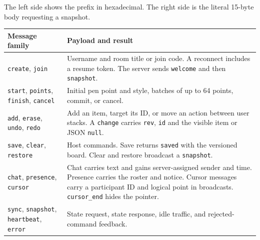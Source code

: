 \documentclass[11pt,a4paper]{article}
\newcommand{\code}[1]{\texttt{#1}}
\newcommand{\command}[1]{\par\smallskip{\small\ttfamily #1}\par\smallskip}
\begin{document}
\command{00 00 00 0F\quad\{"type":"sync"\}}
The left side shows the prefix in hexadecimal. The right side is the literal 15-byte body requesting a snapshot.

\begin{center}
\label{fig:sequence}
\end{center}

\small
\begin{tabularx}{\linewidth}{@{}P{36mm}Y@{}}
\toprule
\textbf{Message family} & \textbf{Payload and result}\\
\midrule
\code{create}, \code{join} & Username and room title or join code. A reconnect includes a resume token. The server sends \code{welcome} and then \code{snapshot}.\\
\code{start}, \code{points}, \code{finish}, \code{cancel} & Initial pen point and style, batches of up to 64 points, commit, or cancel.\\
\code{add}, \code{erase}, \code{undo}, \code{redo} & Add an item, target its ID, or move an action between user stacks. A \code{change} carries \code{rev}, \code{id} and the visible item or JSON \code{null}.\\
\code{save}, \code{clear}, \code{restore} & Host commands. Save returns \code{saved} with the versioned board. Clear and restore broadcast a \code{snapshot}.\\
\code{chat}, \code{presence}, \code{cursor} & Chat carries text and gains server-assigned sender and time. Presence carries the roster and notice. Cursor messages carry a participant ID and logical point in broadcasts. \code{cursor\_end} hides the pointer.\\
\code{sync}, \code{snapshot}, \code{heartbeat}, \code{error} & State request, state response, idle traffic, and rejected-command feedback.\\
\bottomrule
\end{tabularx}
\normalsize
\end{document}
